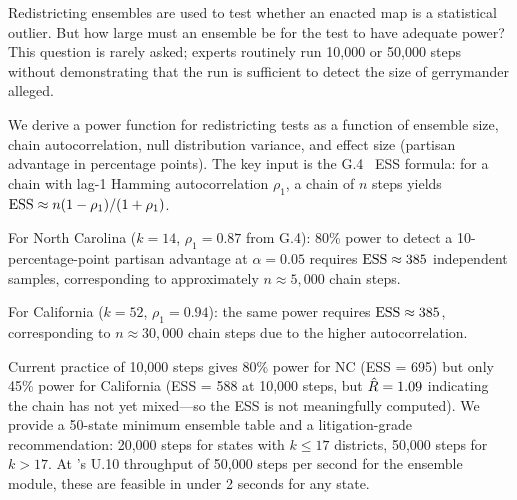 Redistricting ensembles are used to test whether an enacted map is
a statistical outlier.
But how large must an ensemble be for the test to have adequate power?
This question is rarely asked; experts routinely run 10,000 or 50,000
steps without demonstrating that the run is sufficient to detect the
size of gerrymander alleged.

We derive a power function for redistricting tests as a function of
ensemble size, chain autocorrelation, null distribution variance,
and effect size (partisan advantage in percentage points).
The key input is the G.4~\citep{g4paper} ESS formula: for a
\recom{} chain with lag-1 Hamming autocorrelation $\rho_1$,
a chain of $n$ steps yields $\mathrm{ESS} \approx n(1 - \rho_1)/(1 + \rho_1)$.

For North Carolina ($k = 14$, $\rho_1 = 0.87$ from G.4):
80\% power to detect a 10-percentage-point partisan advantage at
$\alpha = 0.05$ requires $\mathrm{ESS} \approx 385$ independent samples,
corresponding to approximately $n \approx 5{,}000$ chain steps.

For California ($k = 52$, $\rho_1 = 0.94$):
the same power requires $\mathrm{ESS} \approx 385$, corresponding to
$n \approx 30{,}000$ chain steps due to the higher autocorrelation.

Current practice of 10,000 steps gives 80\% power for NC (ESS = 695)
but only 45\% power for California (ESS = 588 at 10,000 steps, but
$\hat{R} = 1.09$ indicating the chain has not yet mixed---so the ESS
is not meaningfully computed).
We provide a 50-state minimum ensemble table and a litigation-grade
recommendation: 20,000 steps for states with $k \leq 17$ districts,
50,000 steps for $k > 17$.
At \bisect{}'s U.10 throughput of 50,000 steps per second for the
ensemble module, these are feasible in under 2 seconds for any state.
